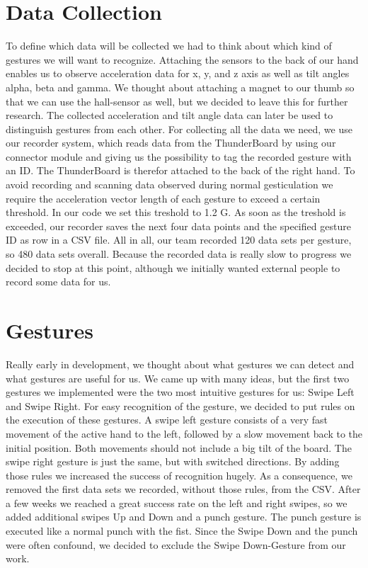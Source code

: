\section{Data Collection}
\label{ch:DataCollection:sec:DataCollection}

To  define  which  data  will  be  collected  we  had  to  think  about  which  kind  of gestures  we  will  want  to  recognize.
Attaching  the  sensors  to  the  back  of  our  hand enables us to observe acceleration data  for x,  y, and z axis  as well  as tilt  angles  alpha, beta and gamma.
We thought about attaching a magnet to our thumb so that we can use the hall-sensor as well,  but we decided to leave this  for  further research.
The collected acceleration and tilt angle data can later be used to distinguish gestures from each other.
For collecting all the data we need, we use our recorder system, which reads data from the ThunderBoard by using our connector module and giving us the possibility to tag the recorded gesture with an ID.
The ThunderBoard is therefor attached to the back of the right hand.
To avoid recording and scanning data observed during normal gesticulation we require the acceleration vector length of each gesture to exceed a certain threshold.
In our code we set this treshold to 1.2 G.
As soon as the treshold is exceeded, our recorder saves the next four data points and the specified gesture ID as row in a CSV file.
All in all, our team recorded 120 data sets per gesture, so 480 data sets overall.
Because the recorded data is really slow to progress we decided to stop at this point, although we initially wanted external people to record some data for us.

\section{Gestures}
\label{ch:DataCollection:sec:Gestures}

Really early in development, we thought about what gestures we can detect and what gestures are useful for us.
We came up with many ideas, but the first two gestures we implemented were the two most intuitive gestures for us: Swipe Left and Swipe Right.
For easy recognition of the gesture, we decided to put rules on the execution of these gestures.
A \glqq swipe left\grqq{} gesture consists of a very fast movement of the active hand to the left, followed by a slow movement back to the initial position.
Both movements should not include a big tilt of the board.
The \glqq swipe right\grqq{} gesture is just the same, but with switched directions.
By adding those rules we increased the success of recognition hugely.
As a consequence, we removed the first data sets we recorded, without those rules, from the CSV.
After a few weeks we reached a great success rate on the left and right swipes, so we added additional swipes \glqq Up\grqq{} and \glqq Down\grqq{} and a punch gesture.
The punch gesture is executed like a normal punch with the fist.
Since the \glqq Swipe Down\grqq{} and the punch were often confound, we decided to exclude the \glqq Swipe Down\grqq -Gesture from our work.

